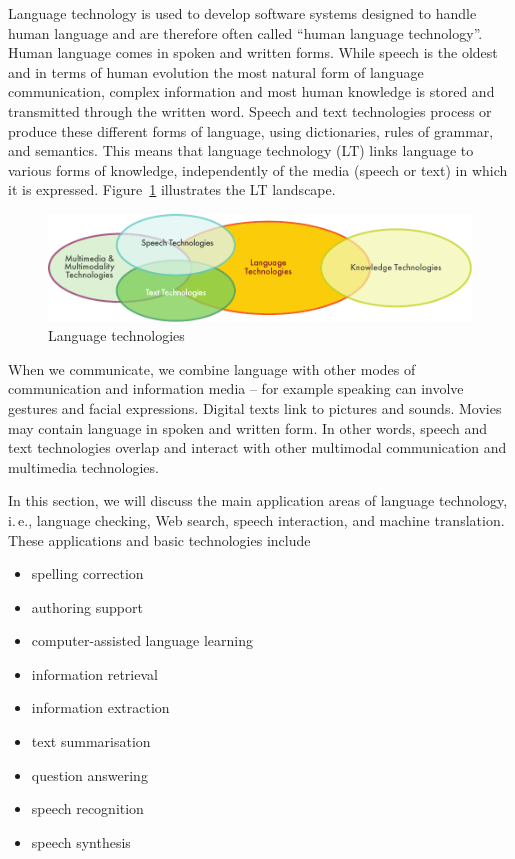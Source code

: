 \begin{multicols}{2}  

Language technology is used to develop software systems designed to handle human language and are therefore often called “human language technology”. Human language comes in spoken and written forms. While speech is the oldest and in terms of human evolution the most natural form of language communication, complex information and most human knowledge is stored and transmitted through the written word. Speech and text technologies process or produce these different forms of language, using dictionaries, rules of grammar, and semantics. This means that language technology (LT) links language to various forms of knowledge, independently of the media (speech or text) in which it is expressed. Figure~\ref{fig:ltincontext_en} illustrates the LT landscape.

\begin{figure}[htb]
  \center
  \includegraphics[width=\textwidth]{../_media/english/language_technologies}
  \caption{Language technologies}
  \label{fig:ltincontext_en}
\end{figure}

When we communicate, we combine language with other modes of communication and information media – for example speaking can involve gestures and facial expressions. Digital texts link to pictures and sounds. Movies may contain language in spoken and written form. In other words, speech and text technologies overlap and interact with other multimodal communication and multimedia technologies.

In this section, we will discuss the main application areas of language technology, i.\,e., language checking, Web search, speech interaction, and machine translation. These applications and basic technologies include 

\begin{itemize}
\item spelling correction
\item authoring support
\item computer-assisted language learning
\item information retrieval 
\item information extraction
\item text summarisation
\item question answering
\item speech recognition 
\item speech synthesis 
\end{itemize}


\end{multicols}
